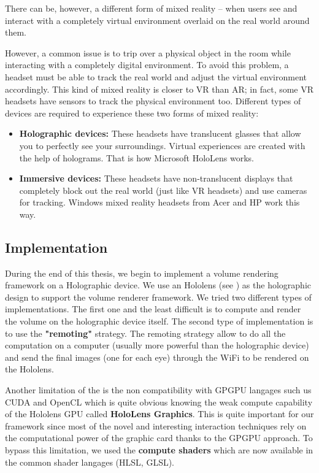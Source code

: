 There can be, however, a different form of mixed reality – when users see and interact with a completely virtual environment overlaid on the real world around them.

However, a common issue is to trip over a physical object in the room while interacting with a completely digital environment.
To avoid this problem, a headset must be able to track the real world and adjust the virtual environment accordingly. This kind of mixed reality is closer to VR than AR; in fact, some VR headsets have sensors to track the physical environment too. Different types of devices are required to experience these two forms of mixed reality:

\begin{itemize}
 \item \textbf{ Holographic devices: } These headsets have translucent glasses that allow you to perfectly see your surroundings. Virtual experiences are created with the help of holograms. That is how Microsoft HoloLens works.
 
 \item \textbf{ Immersive devices:} These headsets have non-translucent displays that completely block out the real world (just like VR headsets) and use cameras for tracking. Windows mixed reality headsets from Acer and HP work this way.

\end{itemize}

\subsection{Implementation}

During the end of this thesis, we begin to implement a volume rendering framework on a Holographic device. We use an Hololens (see \cite{hololens}) as the holographic design to support the volume renderer framework. We tried two different types of implementations. The first one and the least difficult is to compute and render the volume on the holographic device itself. The second type of implementation is to use the \textbf{ "remoting" } strategy. The remoting strategy allow to do all the computation on a computer (usually more powerful than the holographic device) and send the final images (one for each eye) through the WiFi to be rendered on the Hololens.


Another limitation of the \cite{hololens} is the non compatibility with GPGPU langages such us CUDA and OpenCL which is quite obvious knowing the weak compute capability of the Hololens GPU called \textbf{HoloLens Graphics}. This is quite important for our framework since most of the novel and interesting interaction techniques rely on the computational power of the graphic card thanks to the GPGPU approach. \newline
To bypass this limitation, we used the \textbf{ compute shaders} which are now available  in the common shader langages (HLSL, GLSL).


